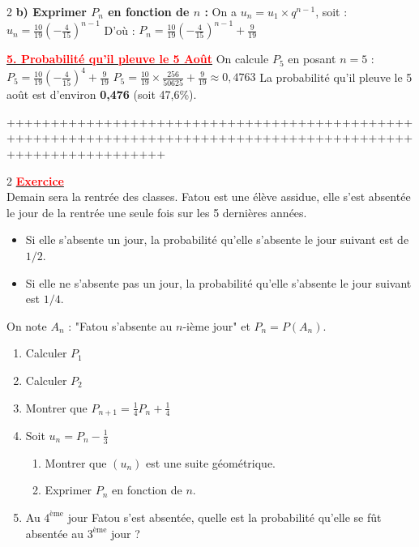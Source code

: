 \documentclass[12pt,a4paper]{article}
\begin{document}
\begin{multicols}{2}
\textbf{b) Exprimer $P_n$ en fonction de $n$ :}
On a $u_n = u_1 \times q^{n-1}$, soit :
$ u_n = \frac{10}{19} \left( -\frac{4}{15} \right)^{n-1} $
D'où :
$ P_n = \frac{10}{19} \left( -\frac{4}{15} \right)^{n-1} + \frac{9}{19} $

\underline{\textbf{\textcolor{red}{5. Probabilité qu'il pleuve le 5 Août}}}
On calcule $P_5$ en posant $n=5$ :
$ P_5 = \frac{10}{19} \left( -\frac{4}{15} \right)^4 + \frac{9}{19} $
$ P_5 = \frac{10}{19} \times \frac{256}{50625} + \frac{9}{19} \approx 0,4763 $
La probabilité qu'il pleuve le 5 août est d'environ \textbf{0,476} (soit 47,6\%).
\end{multicols}

++++++++++++++++++++++++++++++++++++++++++++++++++++++++++++++++++++++++++++++++++++++++++++++++++++++++++++++
\begin{multicols}{2}
\setlength{\columnseprule}{0.1mm} %
\underline{\textbf{\textcolor{red}{Exercice}}}\\

Demain sera la rentrée des classes. Fatou est une élève assidue, elle s'est absentée le jour de la rentrée une seule fois sur les 5 dernières années. 
\begin{itemize}
    \item Si elle s'absente un jour, la probabilité qu'elle s'absente le jour suivant est de $1/2$.
    \item Si elle ne s'absente pas un jour, la probabilité qu'elle s'absente le jour suivant est $1/4$.
\end{itemize}

On note $A_n$ : "Fatou s'absente au $n$-ième jour" et $P_n = P(A_n)$.

\begin{enumerate}
    \item Calculer $P_1$
    \item Calculer $P_2$
    \item Montrer que $P_{n+1} = \frac{1}{4} P_n + \frac{1}{4}$
    \item Soit $u_n = P_n - \frac{1}{3}$
    \begin{enumerate}
        \item Montrer que $(u_n)$ est une suite géométrique.
        \item Exprimer $P_n$ en fonction de $n$.
    \end{enumerate}
    \item Au $4^{\text{ème}}$ jour Fatou s'est absentée, quelle est la probabilité qu'elle se fût absentée au $3^{\text{ème}}$ jour ?
\end{enumerate}
\end{multicols}
\end{document}
